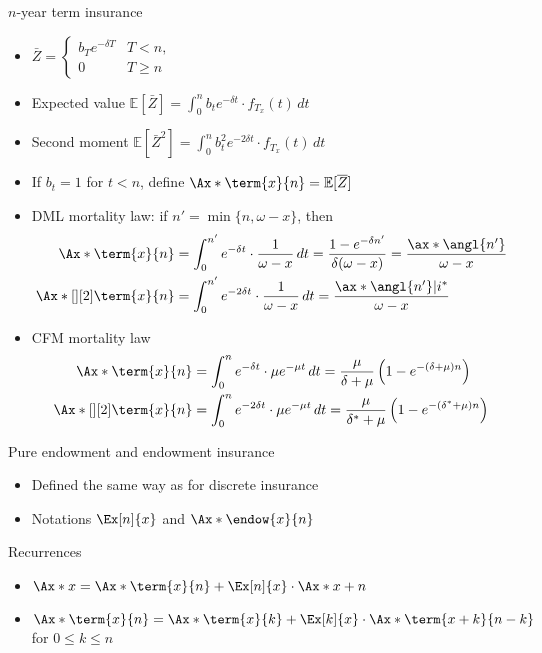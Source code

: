 $n$-year term insurance
\begin{itemize}
\item $\bar{Z} = \begin{cases} b_Te^{-\delta T} & T < n, \\ 0 & T\geq n \end{cases}$
\item Expected value $\mathbb{E}[\bar{Z}] = \int_0^n b_te^{-\delta t}\cdot f_{T_x}(t)\,dt$
\item Second moment $\mathbb{E}[\bar{Z}^2] = \int_0^n b_t^2e^{-2\delta t}\cdot f_{T_x}(t)\,dt$
\item If $b_t = 1$ for $t < n$, define $\Ax*{\term{x}{n}} = \mathbb{E}[\bar{Z}]$
\item DML mortality law: if $n' = \min\{n, \omega - x\}$, then
\begin{align*}
\Ax*{\term{x}{n}} &= \int_0^{n'} e^{-\delta t}\cdot\frac{1}{\omega - x}\,dt = \frac{1 - e^{-\delta n'}}{\delta(\omega - x)} = \frac{\ax*{\angl{n'}}}{\omega - x} \\
\Ax*[][2]{\term{x}{n}} &= \int_0^{n'} e^{-2\delta t}\cdot\frac{1}{\omega - x}\,dt = \frac{\ax*{\angl{n'}|i^{*}}}{\omega - x}
\end{align*}
\item CFM mortality law
\begin{align*}
\Ax*{\term{x}{n}} &= \int_0^n e^{-\delta t}\cdot \mu e^{-\mu t}\,dt = \frac{\mu}{\delta + \mu}\left(1 - e^{-(\delta + \mu)n}\right) \\
\Ax*[][2]{\term{x}{n}} &= \int_0^n e^{-2\delta t}\cdot \mu e^{-\mu t}\,dt = \frac{\mu}{\delta^{*} + \mu}\left(1 - e^{-(\delta^{*} + \mu)n}\right)
\end{align*}
\end{itemize}

Pure endowment and endowment insurance
\begin{itemize}
\item Defined the same way as for discrete insurance
\item Notations $\Ex[n]{x}$ and $\Ax*{\endow{x}{n}}$
\end{itemize}

Recurrences
\begin{itemize}
\item $\Ax*{x} = \Ax*{\term{x}{n}} + \Ex[n]{x}\cdot\Ax*{x + n}$
\item $\Ax*{\term{x}{n}} = \Ax*{\term{x}{k}} + \Ex[k]{x}\cdot\Ax*{\term{x + k}{n - k}}$ for $0\leq k\leq n$
\end{itemize}